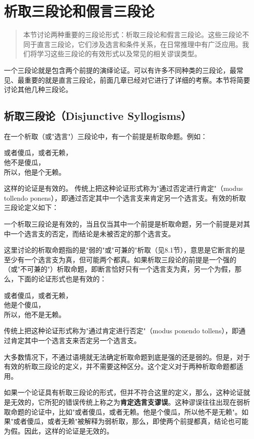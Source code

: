 \section{析取三段论和假言三段论}

\begin{quotation}
本节讨论两种重要的三段论形式：析取三段论和假言三段论。这些三段论不同于直言三段论，它们涉及选言和条件关系，在日常推理中有广泛应用。我们将学习这些三段论的有效形式以及常见的相关谬误类型。
\end{quotation}

一个三段论就是包含两个前提的演绎论证。可以有许多不同种类的三段论，最常见、最重要的就是直言三段论，前面几章已经对它进行了详细的考察。本节将简要讨论其他几种三段论。

\subsection{析取三段论（Disjunctive Syllogisms）}
在一个析取（或"选言"）三段论中，有一个前提是析取命题。例如：

或者傻瓜，或者无赖，\\
他不是傻瓜，\\
所以，他是个无赖。

这样的论证是有效的。\cite{boole1854} 传统上把这种论证形式称为"通过否定进行肯定"（modus tollendo ponens），即通过否定其中一个选言支来肯定另一个选言支。有效的析取三段论定义如下：

一个析取三段论是有效的，当且仅当其中一个前提是析取命题，另一个前提是对其中一个选言支的否定，而结论是未被否定的那个选言支。

这里讨论的析取命题指的是"弱的"或"可兼的"析取（见8.1节），意思是它断言的是至少有一个选言支为真，但可能两个都真。如果析取三段论的前提是一个强的（或"不可兼的"）析取命题，即断言恰好只有一个选言支为真，另一个为假，那么，下面的论证形式也是有效的：

或者傻瓜，或者无赖，\\
他是个傻瓜，\\
所以，他不是无赖。

传统上把这种论证形式称为"通过肯定进行否定"（modus ponendo tollens），即通过肯定其中一个选言支来否定另一个选言支。

大多数情况下，不通过语境就无法确定析取命题到底是强的还是弱的。但是，对于有效的析取三段论的定义，并不需要这种区分。这个定义对于两种析取命题都适用。

如果一个论证具有析取三段论的形式，但并不符合这里的定义，那么，这种论证就是无效的，它所犯的错误传统上称之为\textbf{肯定选言支谬误}。这种谬误往往出现在弱析取命题的论证中，比如"或者傻瓜，或者无赖。他是个傻瓜，所以他不是无赖"。如果"或者傻瓜，或者无赖"被解释为弱析取，那么，即使两个前提都真，结论也可能为假。因此，这样的论证是无效的。

